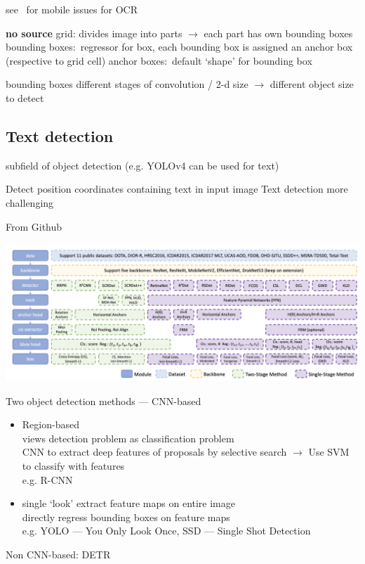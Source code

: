 see~\cite{sourvanos_challenges_2018} for mobile issues for \ac{OCR}

\textbf{no source}
grid: divides image into parts $\rightarrow$ each part has own bounding boxes
bounding boxes:~regressor for box, each bounding box is assigned an anchor box (respective to grid cell)
anchor boxes:~default `shape' for bounding box

bounding boxes different stages of convolution / 2-d size $\rightarrow$ different object size to detect

\subsection*{Text detection}
subfield of object detection (e.g. YOLOv4 can be used for text)

Detect position coordinates containing text in input image
Text detection more challenging

From Github~\citep{noauthor_yangxue0827rotationdetection_nodate}

\includegraphics[width=\textwidth]{img/Detection-Modules.png}

Two object detection methods --- CNN-based
\begin{itemize}
    \item Region-based \\
        views detection problem as classification problem\\
        CNN to extract deep features of proposals by selective search $\rightarrow$  Use SVM to
            classify with features\\
        e.g. R-CNN
    \item  single `look'
        extract feature maps on entire image\\
        directly regress bounding boxes on feature maps\\
        e.g. YOLO --- You Only Look Once, SSD --- Single Shot Detection
\end{itemize}
Non CNN-based: DETR

